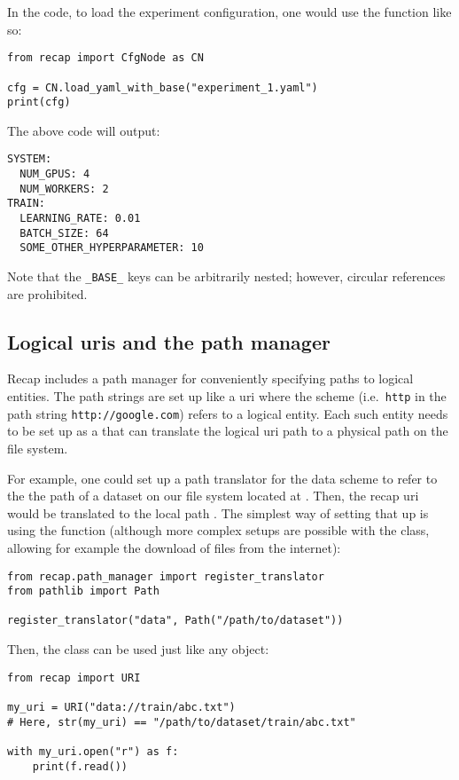 \documentclass[../../report.tex]{subfiles}
\begin{document}
In the code, to load the experiment configuration, one would use the function  like so:

\begin{verbatim}
from recap import CfgNode as CN

cfg = CN.load_yaml_with_base("experiment_1.yaml")
print(cfg)
\end{verbatim}
The above code will output:
\begin{verbatim}
SYSTEM:
  NUM_GPUS: 4
  NUM_WORKERS: 2
TRAIN:
  LEARNING_RATE: 0.01
  BATCH_SIZE: 64
  SOME_OTHER_HYPERPARAMETER: 10
\end{verbatim}
Note that the \texttt{_BASE_} keys can be arbitrarily nested;
however, circular references are prohibited.

\subsection{Logical \acsp{uri} and the path manager}
\label{sec:recap_uris}
Recap includes a path manager for conveniently specifying paths to logical entities.
The path strings are set up like a \gls{uri} where the scheme (i.e.\ \texttt{http} in the path string \texttt{http://google.com}) refers to a logical entity.
Each such entity needs to be set up as a  that can translate the logical \gls{uri} path to a physical path on the file system.

For example, one could set up a path translator for the data scheme to refer to the the path of a dataset on our file system located at .
Then, the recap \gls{uri}  would be translated to the local path .
The simplest way of setting that up is using the  function (although more complex setups are possible with the  class, allowing for example the download of files from the internet):
\begin{verbatim}
from recap.path_manager import register_translator
from pathlib import Path

register_translator("data", Path("/path/to/dataset"))
\end{verbatim}
Then, the  class can be used just like any  object:
\begin{verbatim}
from recap import URI

my_uri = URI("data://train/abc.txt")
# Here, str(my_uri) == "/path/to/dataset/train/abc.txt"

with my_uri.open("r") as f:
    print(f.read())
\end{verbatim}
\end{document}
